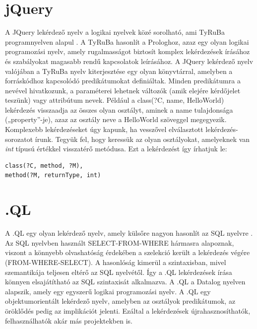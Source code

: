 \documentclass[a4paper,12pt]{report}
\begin{document}
\section{jQuery}
A JQuery lekérdező nyelv a logikai nyelvek közé sorolható, ami TyRuBa programnyelven alapul \cite{jquery}. A TyRuBa hasonlít a Prologhoz, azaz egy olyan logikai programozási nyelv, amely rugalmasságot biztosít komplex lekérdezések írásához és szabályokat magasabb rendű kapcsolatok leírásához. A JQuery lekérdező nyelv valójában a TyRuBa nyelv kiterjesztése egy olyan könyvtárral, amelyben a forráskódhoz kapcsolódó predikátumokat definiáltak. Minden predikátumra a nevével hivatkozunk, a paraméterei lehetnek változók (amik elejére kérdőjelet teszünk) vagy attribútum nevek. Például a class(?C, name, HelloWorld) lekérdezés visszaadja az összes olyan osztályt, aminek a name tulajdonsága („property”-je), azaz az osztály neve a HelloWorld szöveggel megegyezik. Komplexebb lekérdezéseket úgy kapunk, ha vesszővel elválasztott lekérdezés-sorozatot írunk. Tegyük fel, hogy keressük az olyan osztályokat, amelyeknek van \textit{int} típusú értékkel visszatérő metódusa. Ezt a lekérdezést így írhatjuk le:

\begin{verbatim}
class(?C, method, ?M),
method(?M, returnType, int)
\end{verbatim}

\section{.QL}
A .QL egy olyan lekérdező nyelv, amely külsőre nagyon hasonlít az SQL nyelvre \cite{dotql}. Az SQL nyelvben használt SELECT-FROM-WHERE hármasra alapoznak, viszont a könnyebb olvashatóság érdekében a szelekció került a lekérdezés végére (FROM-WHERE-SELECT). A hasonlóság kimerül a szintaxisban, mivel szemantikája teljesen eltérő az SQL nyelvétől. Így a .QL lekérdezések írása könnyen elsajátítható az SQL szintaxisát alkalmazva. A .QL a Datalog nyelven alapszik, amely egy egyszerű logikai programozási nyelv. A .QL egy objektumorientált lekérdező nyelv, amelyben az osztályok predikátumok, az öröklődés pedig az implikációt jelenti. Ezáltal a lekérdezések újrahasznosíthatók, felhasználhatók akár más projektekben is.
\end{document}
